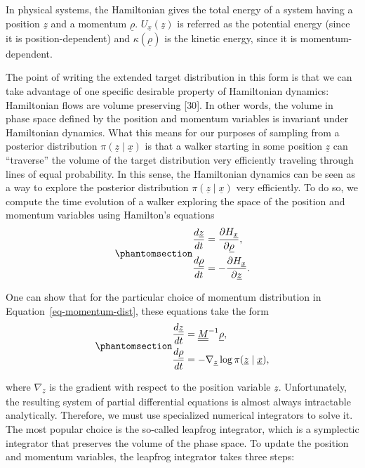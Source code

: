 \documentclass[
]{scrartcl}
\begin{document}
\begin{refsection}
In physical systems, the Hamiltonian gives the total energy of a system
having a position \(\underline{z}\) and a momentum \(\underline{\rho}\).
\(U_{\underline{x}}(\underline{z})\) is referred as the potential energy
(since it is position-dependent) and \(\kappa(\underline{\rho})\) is the
kinetic energy, since it is momentum-dependent.

The point of writing the extended target distribution in this form is
that we can take advantage of one specific desirable property of
Hamiltonian dynamics: Hamiltonian flows are volume preserving {[}30{]}.
In other words, the volume in phase space defined by the position and
momentum variables is invariant under Hamiltonian dynamics. What this
means for our purposes of sampling from a posterior distribution
\(\pi(\underline{z} \mid \underline{x})\) is that a walker starting in
some position \(\underline{z}\) can ``traverse'' the volume of the
target distribution very efficiently traveling through lines of equal
probability. In this sense, the Hamiltonian dynamics can be seen as a
way to explore the posterior distribution
\(π(\underline{z} \mid \underline{x})\) very efficiently. To do so, we
compute the time evolution of a walker exploring the space of the
position and momentum variables using Hamilton's equations
\begin{equation}\phantomsection\label{eq-hamilton-eqs}{
\begin{aligned} \frac{d\underline{z}}{dt} &= \frac{\partial
H_{\underline{x}}}{\partial \underline{\rho}}, \\ \frac{d\underline{\rho}}{dt} &=
-\frac{\partial H_{\underline{x}}}{\partial \underline{z}}. \end{aligned}
}\end{equation}

One can show that for the particular choice of momentum distribution in
Equation~\ref{eq-momentum-dist}, these equations take the form
\begin{equation}\phantomsection\label{eq-hamilton-eqs-expanded}{
\begin{aligned}
\frac{d\underline{z}}{dt} &= \underline{\underline{M}}^{-1} \underline{\rho}, \\
\frac{d\underline{\rho}}{dt} &= 
-\nabla_{\underline{z}} \log \pi(\underline{z} \mid \underline{x}),
\end{aligned}
}\end{equation}

where \(\nabla_{\underline{z}}\) is the gradient with respect to the
position variable \(\underline{z}\). Unfortunately, the resulting system
of partial differential equations is almost always intractable
analytically. Therefore, we must use specialized numerical integrators
to solve it. The most popular choice is the so-called leapfrog
integrator, which is a symplectic integrator that preserves the volume
of the phase space. To update the position and momentum variables, the
leapfrog integrator takes three steps:


\end{refsection}
\end{document}
